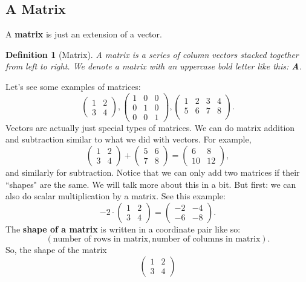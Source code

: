 \documentclass{article}
\newtheorem*{definition}{Definition}
\begin{document}
\subsection{A Matrix}
A \textbf{matrix} is just an extension of a vector. 
\begin{definition}[Matrix]
A matrix is a series of column vectors stacked together from left to right. We denote a matrix with an uppercase bold letter like this: \textbf{A}. 
\end{definition}
Let's see some examples of matrices:
\[
\begin{pmatrix}
1 & 2\\
3 & 4
\end{pmatrix},
\begin{pmatrix}
1 & 0 & 0\\
0 & 1 & 0\\
0 & 0 & 1
\end{pmatrix}, 
\begin{pmatrix}
1 & 2 & 3 & 4\\
5 & 6 & 7 & 8\\
\end{pmatrix}.
\]
Vectors are actually just special types of matrices. We can do matrix addition and subtraction similar to what we did with vectors. For example,
\[\begin{pmatrix}
1 & 2\\
3 & 4
\end{pmatrix}+\begin{pmatrix}
5 & 6\\
7 & 8
\end{pmatrix}=\begin{pmatrix}
6 & 8\\
10 & 12
\end{pmatrix},\]
and similarly for subtraction. Notice that we can only add two matrices if their ``shapes" are the same. We will talk more about this in a bit. But first: we can also do scalar multiplication by a matrix. See this example:
\[-2\cdot \begin{pmatrix}
1 & 2\\
3 & 4
\end{pmatrix}=\begin{pmatrix}
-2 & -4\\
-6 & -8
\end{pmatrix}.\]
The \textbf{shape of a matrix} is written in a coordinate pair like so: 
\[(\text{number of rows in matrix}, \text{number of columns in matrix}).\]
So, the shape of the matrix 
\[\begin{pmatrix}
1 & 2\\
3 & 4
\end{pmatrix}\]
\end{document}
